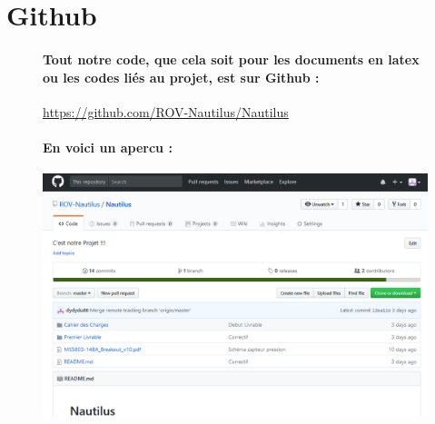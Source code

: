 \documentclass[a4paper,11pt]{report}
\begin{document}
        \section{Github}
					\begin{figure}[!h]
							\paragraph{Tout notre code, que cela soit pour les documents en latex ou les codes liés au projet, est sur Github :\newline}
							\url{https://github.com/ROV-Nautilus/Nautilus}
							\paragraph{En voici un apercu : \newline}
							\begin{center}
								\includegraphics[scale=0.5]{Illustrations/Github.png}
							\end{center}
						\end{figure}
				
\end{document}
